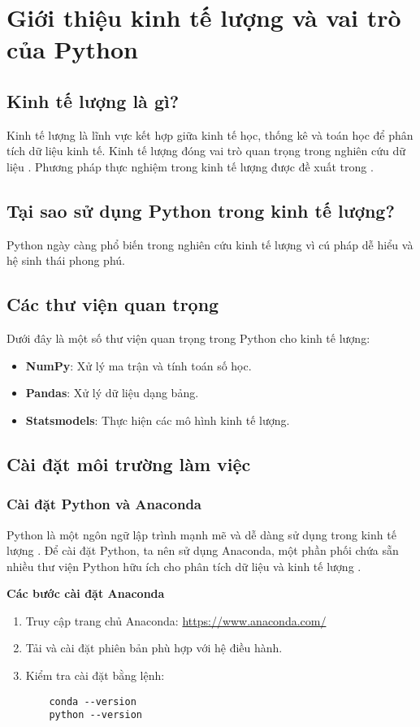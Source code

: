 \chapter{Giới thiệu kinh tế lượng và vai trò của Python}
\section{Kinh tế lượng là gì?}
Kinh tế lượng là lĩnh vực kết hợp giữa kinh tế học, thống kê và toán học để phân tích dữ liệu kinh tế.
Kinh tế lượng đóng vai trò quan trọng trong nghiên cứu dữ liệu \cite{wooldridge2019}.  
Phương pháp thực nghiệm trong kinh tế lượng được đề xuất trong \cite{angrist2009}.

\section{Tại sao sử dụng Python trong kinh tế lượng?}
Python ngày càng phổ biến trong nghiên cứu kinh tế lượng vì cú pháp dễ hiểu và hệ sinh thái phong phú.

\section{Các thư viện quan trọng}
Dưới đây là một số thư viện quan trọng trong Python cho kinh tế lượng:
\begin{itemize}
    \item \textbf{NumPy}: Xử lý ma trận và tính toán số học.
    \item \textbf{Pandas}: Xử lý dữ liệu dạng bảng.
    \item \textbf{Statsmodels}: Thực hiện các mô hình kinh tế lượng.
\end{itemize}


\section{Cài đặt môi trường làm việc}
\subsection{Cài đặt Python và Anaconda}
Python là một ngôn ngữ lập trình mạnh mẽ và dễ dàng sử dụng trong kinh tế lượng \cite{van2020python}. 
Để cài đặt Python, ta nên sử dụng Anaconda, một phần phối chứa sẵn nhiều thư viện Python hữu ích cho phân tích dữ liệu và kinh tế lượng \cite{continuum2018anaconda}.

\textbf{Các bước cài đặt Anaconda}
\begin{enumerate}
    \item Truy cập trang chủ Anaconda: \url{https://www.anaconda.com/}
    \item Tải và cài đặt phiên bản phù hợp với hệ điều hành.
    \item Kiểm tra cài đặt bằng lệnh:
    \begin{verbatim}
    conda --version
    python --version
    \end{verbatim}
\end{enumerate}

